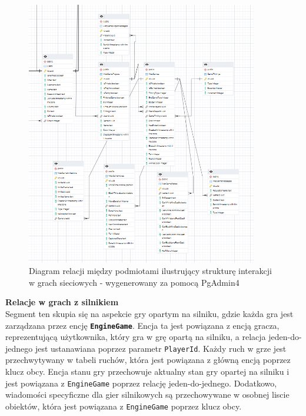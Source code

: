 \documentclass[12pt,a4paper]{article}
\begin{document}
\vspace{1cm}
\begin{figure}[h!]
    \centering
    \includegraphics[width=0.9\textwidth]{images/ERD_online.png}
    \caption{Diagram relacji między podmiotami ilustrujący strukturę interakcji w grach sieciowych - wygenerowany za pomocą PgAdmin4}
\end{figure}

\newpage

\noindent \textbf{Relacje w grach z silnikiem}\\
Segment ten skupia się na aspekcie gry opartym na silniku, gdzie każda gra jest zarządzana przez encję \textbf{\texttt{EngineGame}}. Encja ta jest powiązana z encją gracza, reprezentującą użytkownika, który gra w grę opartą na silniku, a relacja jeden-do-jednego jest ustanawiana poprzez parametr \texttt{PlayerId}. Każdy ruch w grze jest przechwytywany w tabeli ruchów, która jest powiązana z główną encją poprzez klucz obcy. Encja stanu gry przechowuje aktualny stan gry opartej na silniku i jest powiązana z \texttt{EngineGame} poprzez relację jeden-do-jednego. Dodatkowo, wiadomości specyficzne dla gier silnikowych są przechowywane w osobnej liscie obiektów, która jest powiązana z \texttt{EngineGame} poprzez klucz obcy.
\end{document}

